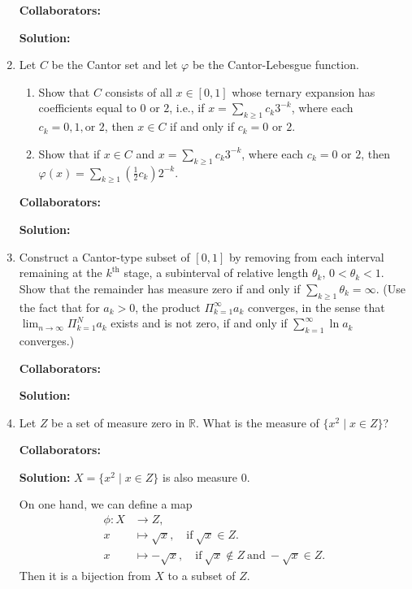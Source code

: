 \documentclass{article}%
\begin{document}
\begin{enumerate}
\bigskip
\textbf{Collaborators:}\\
\smallskip
 
\textbf{Solution:}
\bigskip

\item Let $C$ be the Cantor set and let $\varphi$ be the Cantor-Lebesgue function.
\begin{enumerate}
\item Show that $C$ consists of all $x\in [0,1]$ whose  ternary expansion has coefficients equal to $0$ or $2$, i.e., if $x = \sum_{k\geq 1} c_k3^{-k}$, where each $c_k = 0, 1, \text{or } 2$, then $x\in C$ if and only if $c_k = 0 \text{ or } 2$. 
\item Show that if $x\in C$ and $x = \sum_{k\geq 1} c_k3^{-k}$, where each $c_k = 0 \text{ or } 2$, then $\varphi(x) = \sum_{k\geq 1} (\frac{1}{2} c_k) 2^{-k}$.
\end{enumerate}
\bigskip
\textbf{Collaborators:}\\
\smallskip
 
\textbf{Solution:}
\bigskip

\item  Construct a Cantor-type subset of $[0,1]$ by removing from each interval remaining at the $k^{\text{th}}$ stage, a subinterval of relative length $\theta_k$, $0 < \theta_k < 1$. Show that the remainder has measure zero if and only if $\sum_{k\geq 1} \theta_k = \infty$.  (Use the fact that for $a_k > 0$, the product $\Pi_{k = 1}^{\infty} a_k$ converges, in the sense that $\lim_{n\to \infty} \Pi_{k=1}^N a_k$ exists and  is not zero, if and only if $\sum_{k =1}^{\infty} \ln a_k$ converges.)

\bigskip
\textbf{Collaborators:}\\
\smallskip
 
\textbf{Solution:}
\bigskip





\item Let $Z$ be a set of measure zero in $\mathbb{R}$.  What is the measure of $\{x^2 \mid x\in Z\}$?



\bigskip
\textbf{Collaborators:}\\
\smallskip
 
\textbf{Solution:}
$X = \{x^2\mid x\in Z\}$ is also measure 0. 

On one hand, we can define a map 
$$
\begin{aligned}
\phi: X &\to Z, \\
x&\mapsto \sqrt{x}, \quad\text{if}~ \sqrt{x}\in Z. \\
x&\mapsto -\sqrt{x}, \quad\text{if}~ \sqrt{x}\notin Z ~\text{and}~ -\sqrt{x}\in Z.
\end{aligned}
$$
Then it is a bijection from $X$ to a subset of $Z$.


\end{enumerate}
\end{document}
